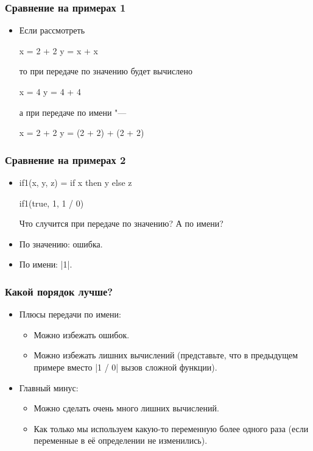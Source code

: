 \documentclass[11pt]{beamer}
\begin{document}
\begin{frame}[fragile]
  \frametitle{Сравнение на примерах 1}
  \begin{itemize}
    \item Если рассмотреть
          \begin{haskell}
            x = 2 + 2
            y = x + x
          \end{haskell}
          то при передаче по значению будет вычислено \pause
          \begin{haskell}
            x = 4
            y = 4 + 4
          \end{haskell}
          а при передаче по имени "--- \pause
          \begin{haskell}
            x = 2 + 2
            y = (2 + 2) + (2 + 2)
          \end{haskell}
  \end{itemize}
\end{frame}

\begin{frame}[fragile]
  \frametitle{Сравнение на примерах 2}
  \begin{itemize}
    \item
          \begin{haskell}
            if1(x, y, z) = if x then y else z

            if1(true, 1, 1 / 0)
          \end{haskell}
          Что случится при передаче по значению? А по имени?
          \pause
    \item По значению: ошибка.
          \pause
    \item По имени: \haskinline|1|.
  \end{itemize}
\end{frame}

\begin{frame}[fragile]
  \frametitle{Какой порядок лучше?}
  \begin{itemize}
    \item Плюсы передачи по имени:
          \pause
          \begin{itemize}
            \item Можно избежать ошибок.
            \item Можно избежать лишних вычислений
                  \pause (представьте, что в предыдущем примере вместо \haskinline|1 / 0| вызов сложной функции).
          \end{itemize}
          \pause
    \item Главный минус:
          \pause
          \begin{itemize}
            \item Можно сделать очень много лишних вычислений.
                  \pause
            \item Как только мы используем какую-то переменную более одного раза
                  \pause (если переменные в её определении не изменились).
          \end{itemize}
  \end{itemize}
\end{frame}
\end{document}
